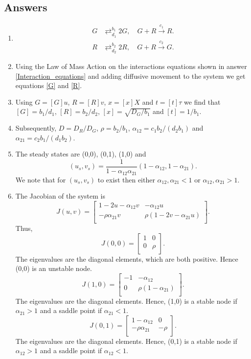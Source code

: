 \documentclass[10pt]{article}
\newcommand{\bb}{\begin{equation}}
\newcommand{\ee}{\end{equation}}
\newcommand{\eqns}[2]{equations \eqref{#1} and \eqref{#2}}
\renewcommand{\l}{\left(}
\renewcommand{\r}{\right)}
\begin{document}
\begin{Answ}
\subsection{Answers}
\begin{enumerate}
\item \label{Interaction_equations}
\begin{align}
G&\mathrel{\mathop{\rightleftarrows}^{b_1}_{d_1}}2G,\quad G+R\stackrel{c_1}{\rightarrow}R.\\
R&\mathrel{\mathop{\rightleftarrows}^{b_2}_{d_2}}2R,\quad G+R\stackrel{c_2}{\rightarrow}G.
\end{align}

\item Using the Law of Mass Action on the interactions equations shown in answer \ref{Interaction_equations} and adding diffusive movement to the system we get \eqns{G}{R}.

\item Using $G=[G]u$, $R=[R]v$, $x=[x]X$ and $t= [t]\tau$ we find that $[G]=b_1/d_1$, $[R]=b_2/d_2$, $[x]=\sqrt{D_G/b_1}$ and $[t]=1/b_1$. 

\item Subsequently, $D=D_R/D_G$, $\rho=b_2/b_1$, $\alpha_{12}=c_1b_2/(d_2b_1)$ and $\alpha_{21}=c_2b_1/(d_1b_2)$.

\item The steady states are (0,0), (0,1), (1,0) and
\bb
(u_s,v_s)=\frac{1}{1-\alpha_{12}\alpha_{21}}(1-\alpha_{12},1-\alpha_{21}).
\ee
We note that for $(u_s,v_s)$ to exist then either $\alpha_{12}, \alpha_{21}<1$ or $\alpha_{12}, \alpha_{21}>1$.

\item The Jacobian of the system is
\bb
J(u,v)=\left[ {\begin{array}{cc}
   1-2u-\alpha_{12} v & -\alpha_{12}u \\
   -\rho\alpha_{21}v & \rho\l 1-2v-\alpha_{21} u\r \\
  \end{array} } \right].
\ee
Thus,
\bb
J(0,0)=\left[ {\begin{array}{cc}
   1 & 0 \\
   0 & \rho \\
  \end{array} } \right].
\ee
The eigenvalues are the diagonal elements, which are both positive. Hence (0,0) is an unstable node.
\bb
J(1,0)=\left[ {\begin{array}{cc}
   -1 & -\alpha_{12} \\
   0 & \rho(1-\alpha_{21}) \\
  \end{array} } \right].
\ee
The eigenvalues are the diagonal elements. Hence, (1,0) is a stable node if $\alpha_{21}>1$ and a saddle point if $\alpha_{21}<1$.
\bb
J(0,1)=\left[ {\begin{array}{cc}
   1-\alpha_{12} & 0 \\
   -\rho\alpha_{21} & -\rho \\
  \end{array} } \right].
\ee
The eigenvalues are the diagonal elements. Hence, (0,1) is a stable node if $\alpha_{12}>1$ and a saddle point if $\alpha_{12}<1$.



\end{enumerate}
\end{Answ}
\end{document}
